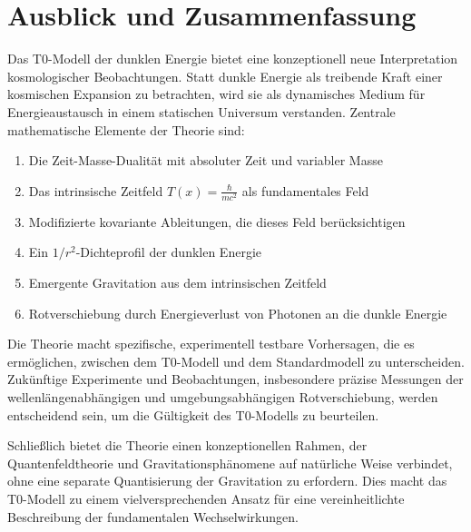 \documentclass[a4paper,12pt]{article}
\theoremstyle{definition}
\theoremstyle{remark}
\newcommand{\Tfield}{T(x)} %
\begin{document}
	\section{Ausblick und Zusammenfassung}
	
	Das T0-Modell der dunklen Energie bietet eine konzeptionell neue Interpretation kosmologischer Beobachtungen. Statt dunkle Energie als treibende Kraft einer kosmischen Expansion zu betrachten, wird sie als dynamisches Medium für Energieaustausch in einem statischen Universum verstanden. Zentrale mathematische Elemente der Theorie sind:
	
	\begin{enumerate}
		\item Die Zeit-Masse-Dualität mit absoluter Zeit und variabler Masse
		\item Das intrinsische Zeitfeld $\Tfield = \frac{\hbar}{mc^2}$ als fundamentales Feld
		\item Modifizierte kovariante Ableitungen, die dieses Feld berücksichtigen
		\item Ein $1/r^2$-Dichteprofil der dunklen Energie
		\item Emergente Gravitation aus dem intrinsischen Zeitfeld
		\item Rotverschiebung durch Energieverlust von Photonen an die dunkle Energie
	\end{enumerate}
	
	Die Theorie macht spezifische, experimentell testbare Vorhersagen, die es ermöglichen, zwischen dem T0-Modell und dem Standardmodell zu unterscheiden. Zukünftige Experimente und Beobachtungen, insbesondere präzise Messungen der wellenlängenabhängigen und umgebungsabhängigen Rotverschiebung, werden entscheidend sein, um die Gültigkeit des T0-Modells zu beurteilen.
	
	Schließlich bietet die Theorie einen konzeptionellen Rahmen, der Quantenfeldtheorie und Gravitationsphänomene auf natürliche Weise verbindet, ohne eine separate Quantisierung der Gravitation zu erfordern. Dies macht das T0-Modell zu einem vielversprechenden Ansatz für eine vereinheitlichte Beschreibung der fundamentalen Wechselwirkungen.
	
\end{document}
